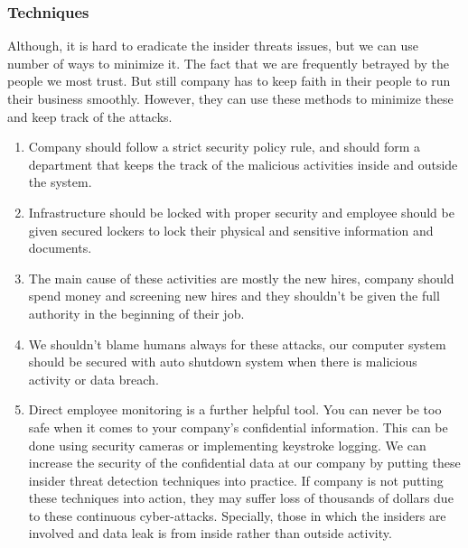 \documentclass{ijitcs}
\begin{document}
\subsubsection{Techniques}
Although, it is hard to eradicate the insider threats issues,
but we can use number of ways to minimize it. The fact that
we are frequently betrayed by the people we most trust. But
still company has to keep faith in their people to run their
business smoothly. However, they can use these methods to
minimize these and keep track of the attacks.
\begin{enumerate}
\item Company should follow a strict security policy rule, and
should form a department that keeps the track of the malicious
activities inside and outside the system.

\item Infrastructure should be locked with proper security and
employee should be given secured lockers to lock their
physical and sensitive information and documents.

\item  The main cause of these activities are mostly the new
hires, company should spend money and screening new hires
and they shouldn’t be given the full authority in the beginning
of their job.

\item  We shouldn’t blame humans always for these attacks,
our computer system should be secured with auto shutdown
system when there is malicious activity or data breach.

\item  Direct employee monitoring is a further helpful tool. You
can never be too safe when it comes to your company’s
confidential information. This can be done using security
cameras or implementing keystroke logging.
We can increase the security of the confidential data at our
company by putting these insider threat detection techniques
into practice. If company is not putting these techniques into
action, they may suffer loss of thousands of dollars due to
these continuous cyber-attacks. Specially, those in which the
insiders are involved and data leak is from inside rather than
outside activity.\cite{singh2022systematic}
\end{enumerate}
\end{document}
